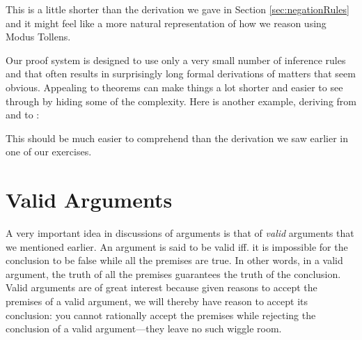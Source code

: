 \begin{argumentN}[1]






\end{argumentN}


This is a little shorter than the derivation we gave in Section          
\ref{sec:negationRules} and it might feel like a more natural representation of 
how we reason using Modus Tollens. 

Our proof system is designed to use only a very small number of inference rules 
and that often results in surprisingly long formal derivations of matters that 
seem obvious. Appealing to theorems can make things a lot shorter and easier to 
see through by hiding some of the complexity. Here is another example, deriving 
from  and  to :

\begin{argumentN}[1]






\end{argumentN}


This should be much easier to comprehend than the derivation we saw earlier in 
one of our exercises. 




\section{Valid Arguments}

A very important idea in discussions of arguments is that of \emph{valid} 
arguments that we mentioned earlier. An argument is said to be valid iff. it is 
impossible for the conclusion to be false while all the premises are true. In 
other words, in a valid argument, the truth of all the premises guarantees the 
truth of the conclusion. Valid arguments are of great interest because given 
reasons to accept the premises of a valid argument, we will thereby have reason 
to accept its conclusion: you cannot rationally accept the premises while 
rejecting the conclusion of a valid argument---they leave no such wiggle room. 

